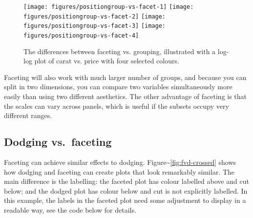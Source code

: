 \begin{figure}
\texttt{[image: figures/positiongroup-vs-facet-1]} \texttt{[image: figures/positiongroup-vs-facet-2]} \texttt{[image: figures/positiongroup-vs-facet-3]} \texttt{[image: figures/positiongroup-vs-facet-4]} \caption{The differences between faceting vs. grouping, illustrated with a log-log plot of carat vs. price with four selected colours.\label{fig:group-vs-facet}}
\end{figure}

Faceting will also work with much larger number of groups, and because
you can split in two dimensions, you can compare two variables
simultaneously more easily than using two different aesthetics. The
other advantage of faceting is that the scales can vary across panels,
which is useful if the subsets occupy very different ranges.

\subsection{Dodging vs.~faceting}\label{sub:dodge-vs-facet}

Faceting can achieve similar effects to dodging.
Figure\textasciitilde{}\ref{fig:fvd-crossed} shows how dodging and
faceting can create plots that look remarkably similar. The main
difference is the labelling: the faceted plot has colour labelled above
and cut below; and the dodged plot has colour below and cut is not
explicitly labelled. In this example, the labels in the faceted plot
need some adjustment to display in a readable way, see the code below
for details.  

\begin{Shaded}
\begin{Highlighting}[]
  \NormalTok{, } 
   \NormalTok{)}
  \NormalTok{, } \StringTok{ }
\StringTok{  }\StringTok{ }\StringTok{ }
\StringTok{  }\NormalTok{(} \NormalTok{(} \NormalTok{, } \NormalTok{, } \NormalTok{, }
    \NormalTok{))}
\end{Highlighting}
\end{Shaded}

